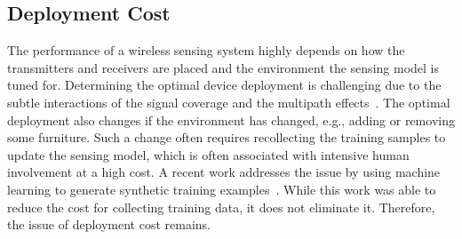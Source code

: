 \subsection{Deployment Cost} The performance of a wireless sensing system highly depends on how the transmitters and receivers are placed
and the environment the sensing model is tuned for. Determining the optimal device deployment is challenging due to the subtle interactions
of the signal coverage and the multipath effects~\cite{wang2016human}. The optimal deployment also changes if the environment has changed,
e.g., adding or removing some furniture. Such a change often requires recollecting the training samples to update the sensing model, which
is often associated with intensive human involvement at a high cost. A recent work addresses the issue by using machine learning to
generate synthetic training examples~\cite{CrossSense}. While this work was able to reduce the cost for collecting training data, it does
not eliminate it. Therefore, the issue of deployment cost remains.




